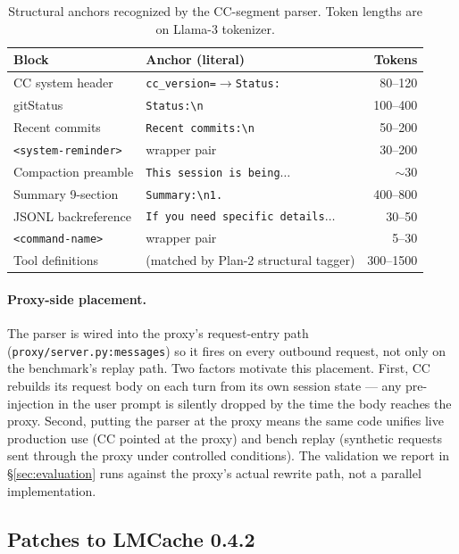 \begin{table}[t]
\centering\small
\begin{tabular}{@{}llr@{}}
\toprule
\textbf{Block} & \textbf{Anchor (literal)} & \textbf{Tokens} \\
\midrule
CC system header   & \texttt{cc\_version=$\to$Status:}  & 80--120 \\
gitStatus          & \texttt{Status:\textbackslash n}   & 100--400 \\
Recent commits     & \texttt{Recent commits:\textbackslash n} & 50--200 \\
\texttt{<system-reminder>} & wrapper pair                & 30--200 \\
Compaction preamble & \texttt{This session is being$\ldots$} & $\sim$30 \\
Summary 9-section  & \texttt{Summary:\textbackslash n1.\ }    & 400--800 \\
JSONL backreference & \texttt{If you need specific details$\ldots$} & 30--50 \\
\texttt{<command-name>} & wrapper pair                & 5--30 \\
Tool definitions   & (matched by Plan-2 structural tagger) & 300--1500 \\
\bottomrule
\end{tabular}
\caption{Structural anchors recognized by the CC-segment parser. Token
lengths are on Llama-3 tokenizer.}
\label{tab:cc-anchors}
\end{table}

\paragraph{Proxy-side placement.}
The parser is wired into the proxy's request-entry path
(\texttt{proxy/server.py:messages}) so it fires on every outbound
request, not only on the benchmark's replay path. Two factors motivate
this placement. First, CC rebuilds its request body on each turn from its own session state
--- any pre-injection in the user prompt is silently dropped by the
time the body reaches the proxy. Second, putting the parser at the
proxy means the same code unifies live production use (CC pointed at
the proxy) and bench replay (synthetic requests sent through the proxy
under controlled conditions). The validation we report in
\S\ref{sec:evaluation} runs against the proxy's actual rewrite path,
not a parallel implementation.

\subsection{Patches to LMCache 0.4.2}
\label{sec:patches}

